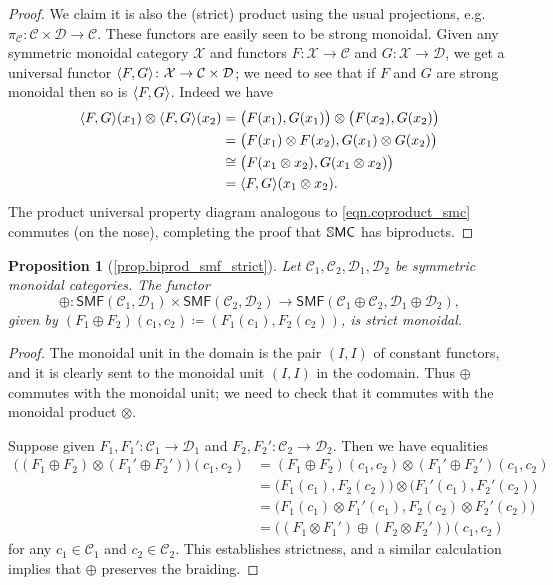 \documentclass[11pt, oneside, article]{memoir}
\theoremstyle{plain}
\newtheorem*{proposition*}{Proposition}
\theoremstyle{definition}
\theoremstyle{remark}
\newcommand{\cat}[1]{\mathcal{#1}}%
\newcommand{\Cat}[1]{{\mathsf{#1}}}%
\newcommand{\CCat}[1]{\mathbb{\StrLeft{#1}{1}}\Cat{\StrGobbleLeft{#1}{1}}}%
\DeclarePairedDelimiter{\pair}{\langle}{\rangle}
\newcommand{\smf}{\Cat{SMF}}
\newcommand{\ssmc}{\CCat{SMC}}
\begin{document}
\begin{proof}
We claim it is also the (strict) product using the usual projections, e.g.\ $\pi_{\cat{C}}\colon\cat{C}\times\cat{D}\to\cat{C}$. These functors are easily seen to be strong monoidal. Given any symmetric monoidal category $\cat{X}$ and functors $F\colon\cat{X}\to\cat{C}$ and $G\colon\cat{X}\to\cat{D}$, we get a universal functor $\pair{F,G}\colon\cat{X}\to\cat{C}\times\cat{D}$; we need to see that if $F$ and $G$ are strong monoidal then so is $\pair{F,G}$. Indeed we have
\begin{align*}
	\pair{F,G}(x_1)\otimes\pair{F,G}(x_2)&=
	\big(F(x_1),G(x_1)\big)\otimes\big(F(x_2),G(x_2)\big)\\&=
	\big(F(x_1)\otimes F(x_2),G(x_1)\otimes G(x_2)\big)\\&\cong
	\big(F(x_1\otimes x_2),G(x_1\otimes x_2)\big)\\&=
	\pair{F,G}(x_1\otimes x_2).
\end{align*}
The product universal property diagram analogous to \cref{eqn.coproduct_smc} commutes (on the nose), completing the proof that $\ssmc$ has biproducts.
\end{proof}

\begin{proposition*}[\ref{prop.biprod_smf_strict}]\label{page.biprod_smf_strict}
Let $\cat{C}_1,\cat{C}_2,\cat{D}_1,\cat{D}_2$ be symmetric monoidal categories. The functor
\begin{equation}\label{eqn.strict_smf_biprod}\oplus\colon\smf(\cat{C}_1,\cat{D}_1)\times\smf(\cat{C}_2,\cat{D}_2)\to\smf(\cat{C}_1\oplus\cat{C}_2,\cat{D}_1\oplus\cat{D}_2),
\end{equation}
given by $(F_1\oplus F_2)(c_1, c_2)\coloneqq (F_1(c_1),F_2(c_2))$, is strict monoidal.
\end{proposition*}
\begin{proof}
The monoidal unit in the domain is the pair $(I,I)$ of constant functors, and it is clearly sent to the monoidal unit $(I,I)$ in the codomain. Thus $\oplus$ commutes with the monoidal unit; we need to check that it commutes with the monoidal product $\otimes$.

Suppose given $F_1, F_1'\colon\cat{C}_1\to\cat{D}_1$ and $F_2,F_2'\colon\cat{C}_2\to\cat{D}_2$. Then we have equalities
\begin{align*}
	\big((F_1\oplus F_2)\otimes(F_1'\oplus F_2')\big)(c_1,c_2)&=
	(F_1\oplus F_2)(c_1,c_2)\otimes(F_1'\oplus F_2')(c_1,c_2)\\&=
	\big(F_1(c_1),F_2(c_2)\big)\otimes\big(F_1'(c_1),F_2'(c_2)\big)\\&=
	\big(F_1(c_1)\otimes F_1'(c_1),F_2(c_2)\otimes F_2'(c_2)\big)\\&=
	\big((F_1\otimes F_1')\oplus(F_2\otimes F_2')\big)(c_1,c_2)
\end{align*}
for any $c_1\in\cat{C}_1$ and $c_2\in\cat{C}_2$. This establishes strictness, and a similar calculation implies that $\oplus$ preserves the braiding.
\end{proof}
\end{document}
